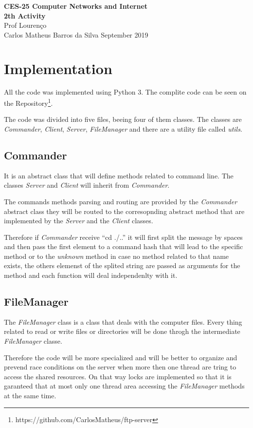 \documentclass[a4paper, 11pt]{article}
\renewcommand*{\i}{\textit}
\begin{document}
\noindent
\large\textbf{CES-25 Computer Networks and Internet} \\
\textbf{2th Activity} \\
\normalsize Prof Lourenço  \\
Carlos Matheus Barros da Silva \hfill September 2019

\section{Implementation}

All the code was implemented using Python 3. The complite code can be seen on the Repository\footnote{https://github.com/CarlosMatheus/ftp-server}.

The code was divided into five files, beeing four of them classes. The classes are \i{Commander}, \i{Client}, \i{Server}, \i{FileManager} and there are a utility file called \i{utils}.

\subsection{Commander}

It is an abstract class that will define methods related to command line. The classes \i{Server} and \i{Client} will inherit from \i{Commander}.

The commands methods parsing and routing are provided by the \i{Commander} abstract class they will be routed to the corresopnding abstract method that are implemented by the \i{Server} and the \i{Client} classes.

Therefore if \i{Commander} receive ``cd ./..'' it will first split the message by spaces and then pass the first element to a command hash that will lead to the specific method or to the \i{unknown} method in case no method related to that name exists, the others elemenst of the splited string are passed as arguments for the method and each function will deal independenlty with it.

\subsection{FileManager}

The \i{FileManager} class is a class that deals with the computer files. Every thing related to read or write files or directories will be done throgh the intermediate \i{FileManager} classe.

Therefore the code will be more specialized and will be better to organize and prevend race conditions on the server when more then one thread are tring to access the shared resources. On that way locks are implemented so that it is garanteed that at most only one thread area accessing the \i{FileManager} methods at the same time.
\end{document}
